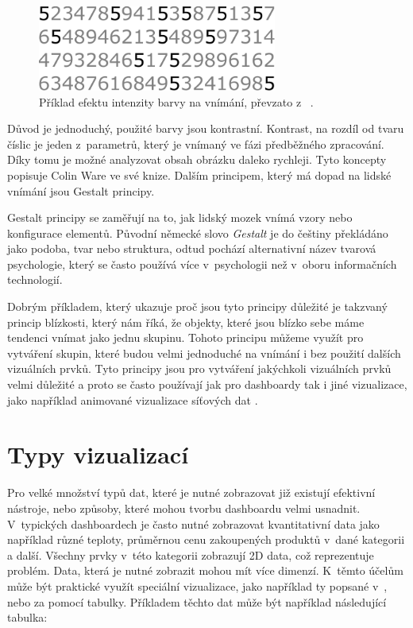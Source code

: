 \begin{figure}[H]
\label{fives2}
\begin{center}
    \includegraphics[width=0.7\textwidth]{obrazky-figures/fives2.pdf}
\end{center}
\caption{Příklad efektu intenzity barvy na vnímání, převzato z~\cite{few2013information} .}
\end{figure}

Důvod je jednoduchý, použité barvy jsou kontrastní. Kontrast, na rozdíl od tvaru číslic je jeden z~parametrů, který je vnímaný ve fázi předběžného zpracování. Díky tomu je možné analyzovat obsah obrázku daleko rychleji. Tyto koncepty popisuje Colin Ware \cite{ware2012information} ve své knize. Dalším principem, který má dopad na lidské vnímání jsou Gestalt principy.

Gestalt principy \cite{black2017information} se zaměřují na to, jak lidský mozek vnímá vzory nebo konfigurace elementů. Původní německé slovo \textit{Gestalt} je do češtiny překládáno jako podoba, tvar nebo struktura, odtud pochází alternativní název tvarová psychologie, který se často používá více v~psychologii než v~oboru informačních technologií. 

Dobrým příkladem, který ukazuje proč jsou tyto principy důležité je takzvaný princip blízkosti, který nám říká, že objekty, které jsou blízko sebe máme tendenci vnímat jako jednu skupinu. Tohoto principu můžeme využít pro vytváření skupin, které budou velmi jednoduché na vnímání i bez použití dalších vizuálních prvků. Tyto principy jsou pro vytváření jakýchkoli vizuálních prvků velmi důležité a proto se často používají jak pro dashboardy tak i jiné vizualizace, jako například animované vizualizace síťových dat \cite{1028859}.

\section{Typy vizualizací}
Pro velké množství typů dat, které je nutné zobrazovat již existují efektivní nástroje, nebo způsoby, které mohou tvorbu dashboardu velmi usnadnit. V~typických dashboardech je často nutné zobrazovat kvantitativní data jako například různé teploty, průměrnou cenu zakoupených produktů v~dané kategorii a další. Všechny prvky v~této kategorii zobrazují 2D data, což reprezentuje problém. Data, která je nutné zobrazit mohou mít více dimenzí. K~těmto účelům může být praktické využít speciální vizualizace, jako například ty popsané v~\cite{marghescu2007multidimensional}, nebo za pomocí tabulky. Příkladem těchto dat může být například následující tabulka:

